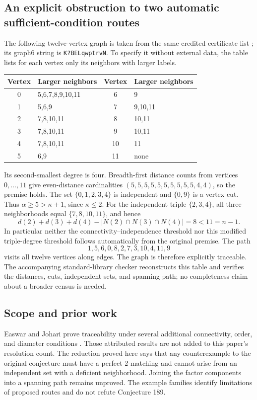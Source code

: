\documentclass[11pt,a4paper]{article}
\theoremstyle{definition}\newtheorem{definition}[theorem]{Definition}
\theoremstyle{remark}\newtheorem{remark}[theorem]{Remark}
\begin{document}
\subsection{An explicit obstruction to two automatic sufficient-condition routes}
The following twelve-vertex graph is taken from the same credited
certificate list \cite{even:pr70}; its graph6 string is
\texttt{K?BELqwptrvN}. To specify it without external data, the table
lists for each vertex only its neighbors with larger labels.
\begin{center}
\begin{tabular}{cl@{\qquad}cl}
\toprule
Vertex&Larger neighbors&Vertex&Larger neighbors\\\midrule
0&5,6,7,8,9,10,11&6&9\\
1&5,6,9&7&9,10,11\\
2&7,8,10,11&8&10,11\\
3&7,8,10,11&9&10,11\\
4&7,8,10,11&10&11\\
5&6,9&11&none\\\bottomrule
\end{tabular}
\end{center}
Its second-smallest degree is four. Breadth-first distance counts from
vertices $0,\ldots,11$ give even-distance cardinalities
$(5,5,5,5,5,5,5,5,5,5,4,4)$, so the premise holds.
The set $\{0,1,2,3,4\}$ is independent and $\{0,9\}$ is a vertex
cut. Thus $\alpha\ge5>\kappa+1$, since $\kappa\le2$.
For the independent triple $\{2,3,4\}$, all three neighborhoods equal
$\{7,8,10,11\}$, and hence
\[
 d(2)+d(3)+d(4)-|N(2)\cap N(3)\cap N(4)|=8<11=n-1.
\]
In particular neither the connectivity--independence threshold nor this
modified triple-degree threshold follows automatically from the original
premise. The path
\[
 1,5,6,0,8,2,7,3,10,4,11,9
\]
visits all twelve vertices along edges. The graph is therefore
explicitly traceable. The accompanying standard-library checker
reconstructs this table and verifies the distances, cuts, independent
sets, and spanning path; no completeness claim about a broader census
is needed.

\subsection{Scope and prior work}
Easwar and Johari prove traceability under several additional
connectivity, order, and diameter conditions \cite{even:ej}.
Those attributed results are not added to this paper's resolution
count. The reduction proved here says that any counterexample to the
original conjecture must have a perfect 2-matching and cannot arise
from an independent set with a deficient neighborhood. Joining the
factor components into a spanning path remains unproved. The example
families identify limitations of proposed routes and do not refute
Conjecture 189.
\end{document}
